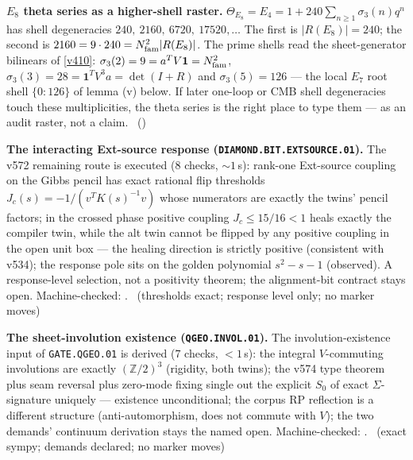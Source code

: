 \par\smallskip\noindent\textbf{$E_8$ theta series as a higher-shell raster.}
$\Theta_{E_8}=E_4=1+240\sum_{n\ge1}\sigma_3(n)q^n$ has shell degeneracies
$240,\ 2160,\ 6720,\ 17520,\dots$ The first is $|R(E_8)|=240$; the second is
$2160=9\cdot240=N_{\mathrm{fam}}^2|R(E_8)|$. The prime shells read the sheet-generator bilinears of \vref{v410}:
$\sigma_3(2)=9=a^TV\mathbf 1=N_{\mathrm{fam}}^2$, $\sigma_3(3)=28=\mathbf 1^TV^3a=\det(I{+}R)$ and
$\sigma_3(5)=126$ --- the local $E_7$ root shell $\{0{:}126\}$ of lemma (v) below. If later one-loop or CMB
shell degeneracies touch these multiplicities, the theta series is the right place to type them --- as an
audit raster, not a claim. \mO\ ()

\par\smallskip\noindent\textbf{The interacting Ext-source response
(\texttt{DIAMOND.BIT.EXTSOURCE.01}).}
The v572 remaining route is executed ($8$ checks, ${\sim}1$\,s):
rank-one Ext-source coupling on the Gibbs pencil has exact rational
flip thresholds $J_c(s)=-1/(v^{T}K(s)^{-1}v)$ whose numerators are
exactly the twins' pencil factors; in the crossed phase positive
coupling $J_c\le15/16<1$ heals exactly the compiler twin, while the
alt twin cannot be flipped by any positive coupling in the open unit
box --- the healing direction is strictly positive (consistent with
v534); the response pole sits on the golden polynomial $s^2-s-1$
(observed).  A response-level selection, not a positivity theorem; the
alignment-bit contract stays open. Machine-checked:
.
\mE\ (thresholds exact; response level only; no marker moves)
\par\smallskip

\par\smallskip\noindent\textbf{The sheet-involution existence
(\texttt{QGEO.INVOL.01}).}
The involution-existence input of \texttt{GATE.QGEO.01} is derived
($7$ checks, $<1$\,s): the integral $V$-commuting involutions are
exactly $(\mathbb{Z}/2)^3$ (rigidity, both twins); the v574 type
theorem plus seam reversal plus zero-mode fixing single out the
explicit $S_0$ of exact $\Sigma$-signature uniquely --- existence
unconditional; the corpus RP reflection is a different structure
(anti-automorphism, does not commute with $V$); the two demands'
continuum derivation stays the named open. Machine-checked:
.
\mE\ (exact sympy; demands declared; no marker moves)
\par\smallskip

